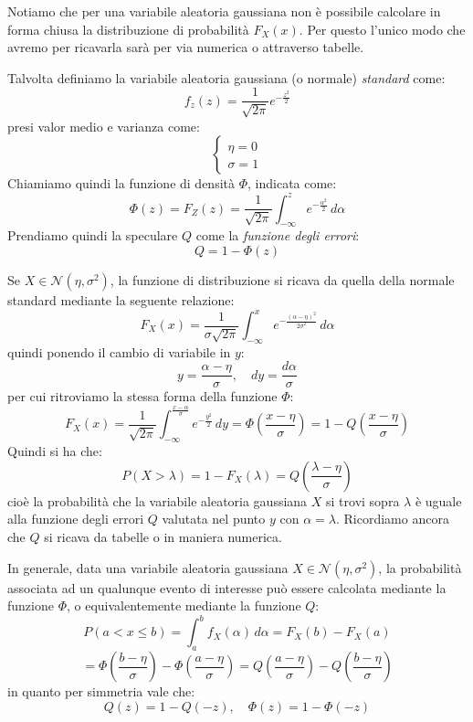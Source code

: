 \documentclass[a4paper,11pt]{article}
\begin{document}
\begin{itemize}
Notiamo che per una variabile aleatoria gaussiana non è possibile calcolare in forma chiusa la distribuzione di probabilità $F_X(x)$. Per questo l'unico modo che avremo per ricavarla sarà per via numerica o attraverso tabelle.

\par\smallskip

Talvolta definiamo la variabile aleatoria gaussiana (o normale) \textit{standard} come:
$$
f_z (z) = \frac{1}{\sqrt{2 \pi}} e^{-\frac{z^2}{2}}
$$
presi valor medio e varianza come:
$$
\begin{cases}
	\eta = 0 \\
	\sigma = 1
\end{cases}
$$
Chiamiamo quindi la funzione di densità $\Phi$, indicata come:
$$
\Phi(z) = F_Z(z) = \frac{1}{\sqrt{2 \pi}} \int_{-\infty}^z e^{-\frac{\alpha^2}{2}} \, d\alpha
$$
Prendiamo quindi la speculare $Q$ come la \textit{funzione degli errori}:
$$
Q = 1 - \Phi(z)
$$

\par\smallskip

Se $X \in \mathcal{N}(\eta, \sigma^2)$, la funzione di distribuzione si ricava da quella della normale standard mediante la seguente relazione:
$$
F_X(x) = \frac{1}{\sigma \sqrt{2 \pi}} \int_{-\infty}^x e^{-\frac{(\alpha - \eta)^2}{2 \sigma^2}} \, d\alpha
$$
quindi ponendo il cambio di variabile in $y$:
$$
y = \frac{\alpha - \eta}{\sigma}, \quad dy = \frac{d\alpha}{\sigma}
$$
per cui ritroviamo la stessa forma della funzione $\Phi$:
$$
F_X(x) = \frac{1}{\sqrt{2 \pi}} \int_{-\infty}^{\frac{x - \alpha}{\sigma}} e^{-\frac{y^2}{2}} \, dy = \Phi \left( \frac{x - \eta}{\sigma} \right) = 1 - Q \left( \frac{x - \eta}{\sigma} \right)
$$
Quindi si ha che:
$$
P(X > \lambda) = 1 - F_X(\lambda) = Q \left( \frac{\lambda - \eta}{\sigma} \right)
$$
cioè la probabilità che la variabile aleatoria gaussiana $X$ si trovi sopra $\lambda$ è uguale alla funzione degli errori $Q$ valutata nel punto $y$ con $\alpha = \lambda$. Ricordiamo ancora che $Q$ si ricava da tabelle o in maniera numerica.

\par\smallskip

In generale, data una variabile aleatoria gaussiana $X \in \mathcal{N}(\eta, \sigma^2)$, la probabilità associata ad un qualunque evento di interesse può essere calcolata mediante la funzione $\Phi$, o equivalentemente mediante la funzione $Q$:
$$
P(a < x \leq b) = \int_a^b f_X(\alpha) \, d\alpha = F_X(b) - F_X(a) 
$$
$$
= \Phi\left(\frac{b - \eta}{\sigma}\right) - \Phi\left(\frac{a - \eta}{\sigma}\right)
= Q\left(\frac{a - \eta}{\sigma}\right) - Q\left(\frac{b - \eta}{\sigma}\right)
$$
in quanto per simmetria vale che:
$$
Q(z) = 1 - Q(-z), \quad \Phi(z) = 1 - \Phi(-z)
$$

\end{itemize}
\end{document}

